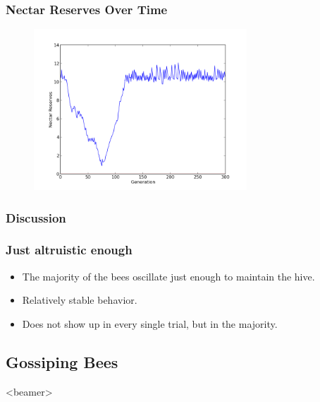 \documentclass{beamer}
\begin{document}
        \begin{frame}[t]\frametitle{Nectar Reserves Over Time}
          \begin{figure}
          \includegraphics[width=8cm]{results/recurrent_bees_nectar.png}
          \end{figure}
        \end{frame}

      \subsubsection{Discussion} %
      \label{ssub:discussion}
        \begin{frame}[c]\frametitle{Just altruistic enough}
            
          \begin{itemize}
            \item The majority of the bees oscillate just enough to maintain 
                  the hive.
            \item Relatively stable behavior.
            \item Does not show up in every single trial, but in the majority.
          \end{itemize}
        
        \end{frame}




    \subsection{Gossiping Bees} %
    \label{sub:gossipping_bees}
  
      \setcounter{tocdepth}{2}
      \begin{frame}<beamer>
      \end{frame}
      \setcounter{tocdepth}{3}
    
\end{document}
